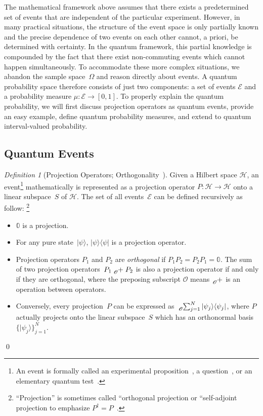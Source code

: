 \documentclass{article}
\theoremstyle{remark}
\newtheorem{definition}{Definition}
\newcommand{\events}{\ensuremath{\mathcal{E}}}
\newcommand{\qevents}{\ensuremath{\mathcal{E}}}
\newcommand{\Hilb}{\mathcal{H}}
\newcommand{\ket}[1]{|#1\rangle}
\newcommand{\proj}[1]{|#1 \rangle\langle #1 |}
\begin{document}
The mathematical framework above assumes that there exists a predetermined
set of events that are independent of the particular experiment. However,
in many practical situations, the structure of the event space is
only partially known and the precise dependence of two events on each
other cannot, a priori, be determined with certainty. In the quantum
framework, this partial knowledge is compounded by the fact that there
exist non-commuting events which cannot happen simultaneously. To
accommodate these more complex situations, we abandon the sample space~$\Omega$
and reason directly about events. A quantum probability space therefore
consists of just two components: a set of events $\qevents$ and a
probability measure $\mu:\qevents\rightarrow[0,1]$. To properly explain
the quantum probability, we will first discuss projection operators
as quantum events, provide an easy example, define quantum probability
measures, and extend to quantum interval-valued probability.

\subsection{Quantum Events}

\begin{definition}[Projection Operators; Orthogonality~\cite{10.2307/2308516,Redhead1987-REDINA,peres1995quantum,Griffiths2003,Swart2013}]
\label{def:Projection} Given a Hilbert space $\Hilb$, an event\footnote{An event is formally called an experimental proposition~\cite{BirkhoffVonNeumann1936},
a question~\cite{10.2307/2308516,DBLP:journals/corr/abs-0910-2393},
or an elementary quantum test~\cite{peres1995quantum}.} mathematically is represented as a projection operator $P:\Hilb\rightarrow\Hilb$
onto a linear subspace~$S$ of $\Hilb$. The set of all events~$\events$
can be defined recursively as follow: \footnote{``Projection'' is sometimes called ``orthogonal projection\textquotedbl{}
or ``self-adjoint projection\textquotedbl{} to emphasize $P^{\dagger}=P$~\cite{Griffiths2003,Maassen2010}.} 
\begin{itemize}
\item $\mathbb{0}$ is a projection. 
\item For any pure state~$\ket{\psi}$, $\proj{\psi}$ is a projection
operator. 
\item Projection operators $P_{1}$ and $P_{2}$ are \emph{orthogonal} if
$P_{1}P_{2}=P_{2}P_{1}=\mathbb{0}$. The sum of two projection operators~$P_{1}\tensor*[_{\mathscr{O}}]{+}{}P_{2}$
is also a projection operator if and only if they are orthogonal,
where the preposing subscript $\mathscr{O}$ means $\tensor*[_{\mathscr{O}}]{+}{}$
is an operation between operators. 
\item Conversely, every projection~$P$ can be expressed as $\tensor*[_{\mathscr{O}}]{\sum}{_{j=1}^{N}}\proj{\psi_{j}}$,
where $P$ actually projects onto the linear subspace~$S$ which
has an orthonormal basis~$\{\ket{\psi_{j}}\}_{j=1}^{N}$. 
\end{itemize}
\qed\end{definition}
\end{document}
